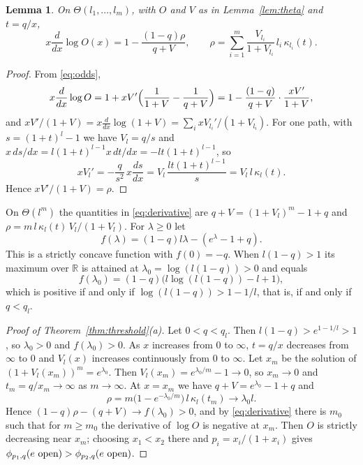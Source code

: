 \documentclass[11pt]{amsart}
\newtheorem{lemma}[theorem]{Lemma}
\theoremstyle{remark}
\numberwithin{equation}{section}
\newcommand{\R}{\mathbb R}
\newcommand{\open}{\ \textup{open}}
\begin{document}
\begin{lemma}\label{lem:derivative}
On $\Theta(l_1,\dots,l_m)$, with $O$ and $V$ as in Lemma~\ref{lem:theta} and $t=q/x$,
\begin{equation}\label{eq:derivative}
 x\frac{d}{dx}\log O(x)=1-\frac{(1-q)\rho}{q+V},\qquad \rho=\sum_{i=1}^m\frac{V_{l_i}}{1+V_{l_i}}\,l_i\,\kappa_{l_i}(t).
\end{equation}
\end{lemma}

\begin{proof}
From \eqref{eq:odds},
\[
 x\frac{d}{dx}\log O=1+xV'\Bigl(\frac1{1+V}-\frac1{q+V}\Bigr)=1-\frac{(1-q)}{q+V}\cdot\frac{xV'}{1+V},
\]
and $xV'/(1+V)=x\frac d{dx}\log(1+V)=\sum_ixV_{l_i}'/(1+V_{l_i})$. For one path, with $s=(1+t)^l-1$ we have $V_l=q/s$ and $x\,ds/dx=l(1+t)^{l-1}x\,dt/dx=-lt(1+t)^{l-1}$, so
\[
 xV_l'=-\frac q{s^2}\,x\frac{ds}{dx}=V_l\,\frac{lt(1+t)^{l-1}}{s}=V_l\,l\,\kappa_l(t).
\]
Hence $xV'/(1+V)=\rho$.
\end{proof}

On $\Theta(l^m)$ the quantities in \eqref{eq:derivative} are $q+V=(1+V_l)^m-1+q$ and $\rho=m\,l\,\kappa_l(t)\,V_l/(1+V_l)$. For $\lambda\ge0$ let
\[
 f(\lambda)=(1-q)l\lambda-(e^\lambda-1+q).
\]
This is a strictly concave function with $f(0)=-q$. When $l(1-q)>1$ its maximum over $\R$ is attained at $\lambda_0=\log(l(1-q))>0$ and equals
\[
 f(\lambda_0)=(1-q)\bigl(l\log(l(1-q))-l+1\bigr),
\]
which is positive if and only if $\log(l(1-q))>1-1/l$, that is, if and only if $q<q_l$.

\begin{proof}[Proof of Theorem~\ref{thm:threshold}\textup{(a)}]
Let $0<q<q_l$. Then $l(1-q)>e^{1-1/l}>1$, so $\lambda_0>0$ and $f(\lambda_0)>0$. As $x$ increases from $0$ to $\infty$, $t=q/x$ decreases from $\infty$ to $0$ and $V_l(x)$ increases continuously from $0$ to $\infty$. Let $x_m$ be the solution of $(1+V_l(x_m))^m=e^{\lambda_0}$. Then $V_l(x_m)=e^{\lambda_0/m}-1\to0$, so $x_m\to0$ and $t_m=q/x_m\to\infty$ as $m\to\infty$. At $x=x_m$ we have $q+V=e^{\lambda_0}-1+q$ and
\[
 \rho=m\bigl(1-e^{-\lambda_0/m}\bigr)\,l\,\kappa_l(t_m)\longrightarrow\lambda_0 l.
\]
Hence $(1-q)\rho-(q+V)\to f(\lambda_0)>0$, and by \eqref{eq:derivative} there is $m_0$ such that for $m\ge m_0$ the derivative of $\log O$ is negative at $x_m$. Then $O$ is strictly decreasing near $x_m$; choosing $x_1<x_2$ there and $p_i=x_i/(1+x_i)$ gives $\phi_{p_1,q}(e\open)>\phi_{p_2,q}(e\open)$.
\end{proof}
\end{document}
